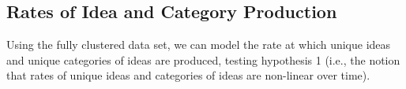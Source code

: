 



\subsection{Rates of Idea and Category Production}
Using the fully clustered data set, we can model the rate at which unique ideas and unique categories of ideas are produced, testing hypothesis 1 (i.e., the notion that rates of unique ideas and categories of ideas are non-linear over time).

